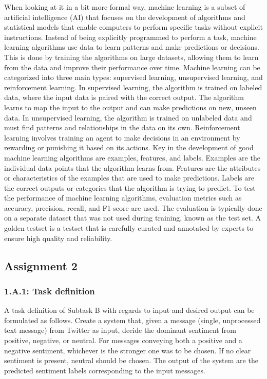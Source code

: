 \documentclass[11pt]{article}
\begin{document}
When looking at it in a bit more formal way, machine learning is a subset of artificial intelligence (AI) that focuses on the development of algorithms and statistical models that enable computers to perform specific tasks without explicit instructions.
Instead of being explicitly programmed to perform a task, machine learning algorithms use data to learn patterns and make predictions or decisions.
This is done by training the algorithms on large datasets, allowing them to learn from the data and improve their performance over time.
Machine learning can be categorized into three main types: supervised learning, unsupervised learning, and reinforcement learning.
In supervised learning, the algorithm is trained on labeled data, where the input data is paired with the correct output.
The algorithm learns to map the input to the output and can make predictions on new, unseen data.
In unsupervised learning, the algorithm is trained on unlabeled data and must find patterns and relationships in the data on its own.
Reinforcement learning involves training an agent to make decisions in an environment by rewarding or punishing it based on its actions.
Key in the development of good machine learning algorithms are examples, features, and labels.
Examples are the individual data points that the algorithm learns from.
Features are the attributes or characteristics of the examples that are used to make predictions.
Labels are the correct outputs or categories that the algorithm is trying to predict.
To test the performance of machine learning algorithms, evaluation metrics such as accuracy, precision, recall, and F1-score are used.
The evaluation is typically done on a separate dataset that was not used during training, known as the test set.
A golden testset is a testset that is carefully curated and annotated by experts to ensure high quality and reliability.

\subsection*{Assignment 2}
\subsubsection*{1.A.1: Task definition}
A task definition of Subtask B \cite{DBLP:journals/corr/abs-1912-06806} with regards to input and desired output can be formulated as follows.
Create a system that, given a message (single, unprocessed text message) from Twitter as input, decide the dominant sentiment from positive, negative, or neutral.
For messages conveying both a positive and a negative sentiment, whichever is the stronger one was to be chosen.
If no clear sentiment is present, neutral should be chosen.
The output of the system are the predicted sentiment labels corresponding to the input messages.
\end{document}
